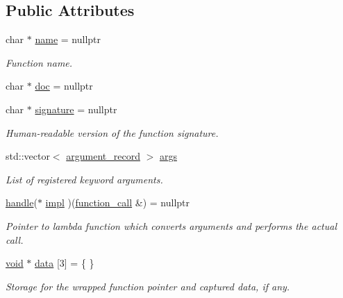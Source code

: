 \subsection*{Public Attributes}
\begin{DoxyCompactItemize}
\item 
char $\ast$ \mbox{\hyperlink{structfunction__record_a55d760eb0046c3beec8a20d94ed1d07c}{name}} = nullptr
\begin{DoxyCompactList}\small\item\em Function name. \end{DoxyCompactList}\item 
char $\ast$ \mbox{\hyperlink{structfunction__record_a01cd5465d0e01d7f0995982b918efed4}{doc}} = nullptr
\item 
char $\ast$ \mbox{\hyperlink{structfunction__record_aed1e3374bb684af2676d1aeb457c65b5}{signature}} = nullptr
\begin{DoxyCompactList}\small\item\em Human-\/readable version of the function signature. \end{DoxyCompactList}\item 
std\+::vector$<$ \mbox{\hyperlink{structargument__record}{argument\+\_\+record}} $>$ \mbox{\hyperlink{structfunction__record_abc060d33223e10553cb15c879e326ef5}{args}}
\begin{DoxyCompactList}\small\item\em List of registered keyword arguments. \end{DoxyCompactList}\item 
\mbox{\hyperlink{classhandle}{handle}}($\ast$ \mbox{\hyperlink{structfunction__record_a0e6a4fd6fef173a1958f8c14c6610ac9}{impl}} )(\mbox{\hyperlink{structfunction__call}{function\+\_\+call}} \&) = nullptr
\begin{DoxyCompactList}\small\item\em Pointer to lambda function which converts arguments and performs the actual call. \end{DoxyCompactList}\item 
\mbox{\hyperlink{_s_d_l__opengles2__gl2ext_8h_ae5d8fa23ad07c48bb609509eae494c95}{void}} $\ast$ \mbox{\hyperlink{structfunction__record_ada09f0077964b216ba0bf9c12cb6c25f}{data}} \mbox{[}3\mbox{]} = \{ \}
\begin{DoxyCompactList}\small\item\em Storage for the wrapped function pointer and captured data, if any. \end{DoxyCompactList}\item 

\end{DoxyCompactItemize}
